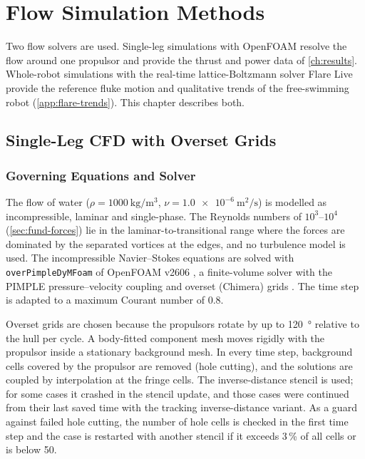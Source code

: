 \chapter{Flow Simulation Methods}
\label{ch:cfd}

Two flow solvers are used. Single-leg simulations with OpenFOAM resolve the flow around one propulsor and
provide the thrust and power data of \cref{ch:results}. Whole-robot simulations with the real-time
lattice-Boltzmann solver Flare Live provide the reference fluke motion and qualitative trends of the free-swimming robot
(\cref{app:flare-trends}). This chapter describes both.

\section{Single-Leg CFD with Overset Grids}
\label{sec:cfd-of}

\subsection{Governing Equations and Solver}

The flow of water ($\rho=\SI{1000}{\kilo\gram\per\cubic\metre}$, $\nu=\SI{1.0e-6}{\square\metre\per\second}$) is modelled as incompressible, laminar and single-phase. The Reynolds numbers of
$10^3$--$10^4$ (\cref{sec:fund-forces}) lie in the laminar-to-transitional range where the forces are dominated by
the separated vortices at the edges, and no turbulence model is used. The incompressible Navier--Stokes equations
are solved with \texttt{overPimpleDyMFoam} of OpenFOAM v2606 \cite{Weller1998}, a finite-volume solver with the
PIMPLE pressure--velocity coupling and overset (Chimera) grids \cite{Windt2020}. The time step is adapted to a
maximum Courant number of 0.8.

Overset grids are chosen because the propulsors rotate by up to \SI{120}{\degree} relative to the hull per cycle.
A body-fitted component mesh moves rigidly with the propulsor inside a stationary background mesh. In every
time step, background cells covered by the propulsor are removed (hole cutting), and the solutions are coupled by
interpolation at the fringe cells. The inverse-distance stencil is used; for some cases it crashed in the stencil
update, and those cases were continued from their last saved time with the tracking inverse-distance variant. As
a guard against failed hole cutting, the number of hole cells is checked in the first time step and the case is
restarted with another stencil if it exceeds 3\,\% of all cells or is below 50.

